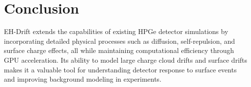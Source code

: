 \section{Conclusion}
EH-Drift extends the capabilities of existing HPGe detector simulations by incorporating detailed physical processes such as diffusion, self-repulsion, and surface charge effects, all while maintaining computational efficiency through GPU acceleration. Its ability to model large charge cloud drifts and surface drifts makes it a valuable tool for understanding detector response to surface events and improving background modeling in experiments.
